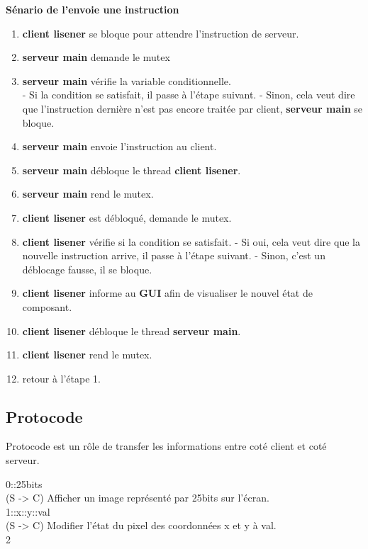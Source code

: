 \documentclass[14px]{article}
\begin{document}
\textbf{Sénario de l'envoie une instruction}
\begin{enumerate}
	\item \textbf{client lisener} se bloque pour attendre l'instruction de serveur.
	\item \textbf{serveur main} demande le mutex
	\item \textbf{serveur main} vérifie la variable conditionnelle.\\
	- Si la condition se satisfait, il passe à l'étape suivant.
	- Sinon, cela veut dire que l'instruction dernière n'est pas encore traitée par client, \textbf{serveur main} se bloque.
	\item \textbf{serveur main} envoie l'instruction au client.
	\item \textbf{serveur main} débloque le thread \textbf{client lisener}.
	\item \textbf{serveur main} rend le mutex.
	\item \textbf{client lisener} est débloqué, demande le mutex.
	\item \textbf{client lisener} vérifie si la condition se satisfait.
	- Si oui, cela veut dire que la nouvelle instruction arrive, il passe à l'étape suivant.
	- Sinon, c'est un déblocage fausse, il se bloque.
	\item \textbf{client lisener} informe au \textbf{GUI} afin de visualiser le nouvel état de composant.
	\item \textbf{client lisener} débloque le thread \textbf{serveur main}.
	\item \textbf{client lisener} rend le mutex.
	\item retour à l'étape 1.
\end{enumerate}


\subsection{Protocode}
Protocode est un rôle de transfer les informations entre coté client et coté serveur.

0::25bits
~\\

(S -> C) Afficher un image représenté par 25bits sur l'écran.
~\\

1::x::y::val
~\\

(S -> C) Modifier l'état du pixel des coordonnées x et y à val.
~\\

2
~\\
\end{document}
